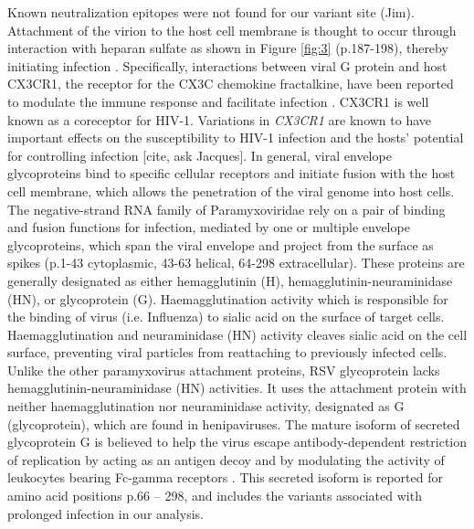 \documentclass{article} %
\begin{document}
Known neutralization epitopes were not found for our variant site (Jim).
Attachment of the virion to the host cell membrane is thought to occur through interaction with heparan sulfate as shown in Figure \ref{fig:3}
(p.187-198), thereby initiating infection 
\citep{levine1987demonstration, feldman1999identification, feldman2000fusion}.
Specifically, interactions between viral G protein and host CX3CR1, the receptor for the CX3C chemokine fractalkine, have been reported to modulate the immune response and facilitate infection 
\citep{johnson2015respiratory, tripp2001cx3c, jeong2015cx3cr1}.
CX3CR1 is well known as a coreceptor for HIV-1. 
Variations in \textit{CX3CR1} are known to have important effects on the susceptibility to HIV-1 infection and the hosts' potential for controlling infection [cite, ask Jacques].
In general, viral envelope glycoproteins bind to specific cellular receptors and initiate fusion with the host cell membrane, 
which allows the penetration of the viral genome into host cells. 
The negative-strand RNA family of Paramyxoviridae rely on a pair of binding and fusion functions for infection, mediated by one or multiple envelope glycoproteins,
which span the viral envelope and project from the surface as spikes 
(p.1-43 cytoplasmic, 43-63 helical, 64-298 extracellular).
These proteins are generally designated as either hemagglutinin (H), hemagglutinin-neuraminidase (HN), or glycoprotein (G). 
Haemagglutination activity which is responsible for the binding of virus (i.e. Influenza) to sialic acid on the surface of target cells.
Haemagglutination and neuraminidase (HN) activity cleaves sialic acid on the cell surface, preventing viral particles from reattaching to previously infected cells. 
Unlike the other paramyxovirus attachment proteins, 
RSV glycoprotein lacks hemagglutinin-neuraminidase (HN) activities.
It uses the attachment protein with neither haemagglutination nor neuraminidase activity, designated as G (glycoprotein), which are found in henipaviruses.
\citep{takimoto2002role, malvoisin1993measles, hu1992functional, horvath1992biological, bousse1994regions}
The mature isoform of secreted glycoprotein G is believed to help the virus escape antibody-dependent restriction of replication by acting as an antigen decoy and by modulating the activity of leukocytes bearing Fc-gamma receptors 
\citep{bukreyev2008secreted}.
This secreted isoform is reported for amino acid positions p.66 – 298, and includes the variants associated with prolonged infection in our analysis. 
\end{document}
